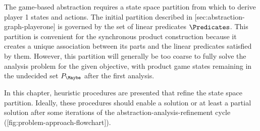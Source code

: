 The game-based abstraction requires a state space partition from which to derive player 1 states and actions.
The initial partition described in [sec:abstraction-graph-playerone] is governed by the set of linear predicates $\Predicates$.
This partition is convenient for the synchronous product construction because it creates a unique association between its parts and the linear predicates satisfied by them.
However, this partition will generally be too coarse to fully solve the analysis problem for the given objective, with product game states remaining in the undecided set $P_\Maybe$ after the first analysis.

In this chapter, heuristic procedures are presented that refine the state space partition.
Ideally, these procedures should enable a solution or at least a partial solution after some iterations of the abstraction-analysis-refinement cycle ([fig:problem-approach-flowchart]).

